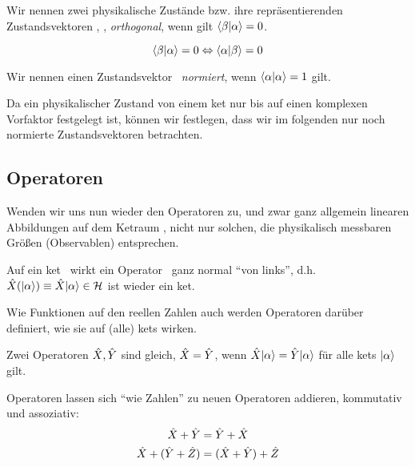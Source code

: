 \begin{defn}
 Wir nennen zwei physikalische Zust\"ande bzw. ihre repr\"asentierenden Zustandsvektoren \keta, \ketb, \emph{orthogonal}, wenn gilt $\braket{\beta | \alpha} = 0$.
\end{defn}
\begin{notiz}
 \begin{equation}
  \braket{\beta | \alpha} = 0 \Leftrightarrow \braket{\alpha | \beta} = 0
 \end{equation}
\end{notiz}

\begin{defn}
 Wir nennen einen Zustandsvektor \keta\ \emph{normiert}, wenn $\braket{\alpha | \alpha} = 1$ gilt.
\end{defn}
\begin{konv}
 Da ein physikalischer Zustand von einem ket nur bis auf einen komplexen Vorfaktor festgelegt ist, k\"onnen wir festlegen, dass wir im folgenden nur noch normierte Zustandsvektoren betrachten.
\end{konv}

\subsection{Operatoren}
Wenden wir uns nun wieder den Operatoren zu, und zwar ganz allgemein linearen Abbildungen auf dem Ketraum \hs, nicht nur solchen, die physikalisch messbaren Gr\"o\ss{}en (Observablen) entsprechen.

\begin{eig}
Auf ein ket \keta\ wirkt ein Operator \opx\ ganz normal \enquote{von links}, d.h. $\opx(\keta) \equiv \opx \keta \in \hs$ ist wieder ein ket.
\end{eig}

\begin{eig}
 Wie Funktionen auf den reellen Zahlen auch werden Operatoren dar\"uber definiert, wie sie auf (alle) kets wirken.
\end{eig}

\begin{bsp}
 Zwei Operatoren $\hat{X}, \hat{Y}$ sind gleich, $\hat{X}=\hat{Y}$, wenn $\opx \keta = \opy \keta$ f\"ur alle kets $\keta$ gilt.
\end{bsp}

\begin{eig}
Operatoren lassen sich \enquote{wie Zahlen} zu neuen Operatoren addieren, kommutativ und assoziativ:
\begin{align}
\hat{X} + \hat{Y} &= \hat{Y} + \hat{X} \\
\hat{X} + (\hat{Y} + \hat{Z}) &= (\hat{X} + \hat{Y}) + \hat{Z}
\end{align}
\end{eig}

